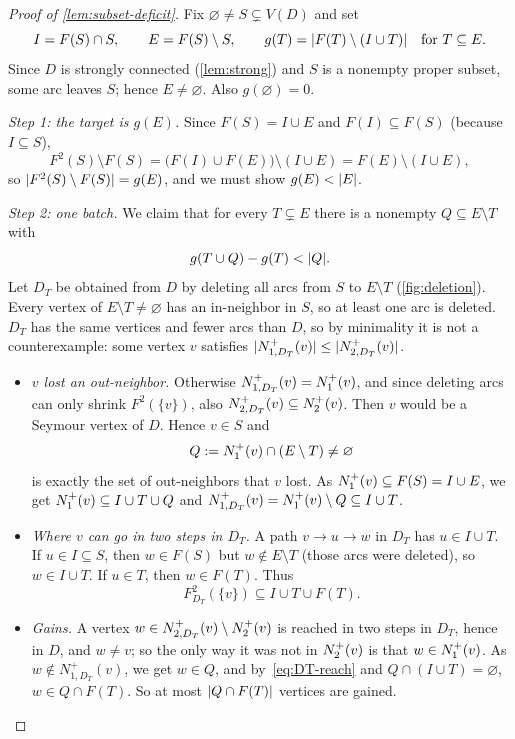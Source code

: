 \begin{proof}[Proof of \cref{lem:subset-deficit}]
Fix $\varnothing\ne S\subsetneq V(D)$ and set
\[
 I=F(S)\cap S,\qquad E=F(S)\setminus S,\qquad
 g(T)=\lvert F(T)\setminus(I\cup T)\rvert\quad\text{for }T\subseteq E.
\]
Since $D$ is strongly connected (\cref{lem:strong}) and $S$ is a nonempty
proper subset, some arc leaves $S$; hence $E\ne\varnothing$. Also
$g(\varnothing)=0$.

\emph{Step 1: the target is $g(E)$.} Since $F(S)=I\cup E$ and
$F(I)\subseteq F(S)$ (because $I\subseteq S$),
\[
 F^2(S)\setminus F(S)=\bigl(F(I)\cup F(E)\bigr)\setminus(I\cup E)
 =F(E)\setminus(I\cup E),
\]
so $\lvert F^2(S)\setminus F(S)\rvert=g(E)$, and we must show $g(E)<\lvert E\rvert$.

\emph{Step 2: one batch.} We claim that for every $T\subsetneq E$ there is a
nonempty $Q\subseteq E\setminus T$ with
\begin{equation}\label{eq:increment}
 g(T\cup Q)-g(T)<\lvert Q\rvert.
\end{equation}
Let $D_T$ be obtained from $D$ by deleting all arcs from $S$ to $E\setminus T$
(\cref{fig:deletion}). Every vertex of $E\setminus T\neq\varnothing$ has an
in-neighbor in $S$, so at least one arc is deleted. $D_T$ has the same
vertices and fewer arcs than $D$, so by minimality it is not a
counterexample: some vertex $v$ satisfies
$\lvert N^+_{1,D_T}(v)\rvert\le\lvert N^+_{2,D_T}(v)\rvert$.

\begin{itemize}[leftmargin=*]
\item \emph{$v$ lost an out-neighbor.} Otherwise $N^+_{1,D_T}(v)=N^+_1(v)$, and
since deleting arcs can only shrink $F^2(\{v\})$, also
$N^+_{2,D_T}(v)\subseteq N^+_2(v)$. Then $v$ would be a Seymour vertex of $D$.
Hence $v\in S$ and
\[
 Q:=N^+_1(v)\cap(E\setminus T)\ne\varnothing
\]
is exactly the set of out-neighbors that $v$ lost. As
$N^+_1(v)\subseteq F(S)=I\cup E$, we get $N^+_1(v)\subseteq I\cup T\cup Q$
and $N^+_{1,D_T}(v)=N^+_1(v)\setminus Q\subseteq I\cup T$.

\item \emph{Where $v$ can go in two steps in $D_T$.} A path $v\to u\to w$ in
$D_T$ has $u\in I\cup T$. If $u\in I\subseteq S$, then $w\in F(S)$ but $w\notin
E\setminus T$ (those arcs were deleted), so $w\in I\cup T$. If $u\in T$,
then $w\in F(T)$. Thus
\begin{equation}\label{eq:DT-reach}
 F^2_{D_T}(\{v\})\subseteq I\cup T\cup F(T).
\end{equation}

\item \emph{Gains.} A vertex $w\in N^+_{2,D_T}(v)\setminus N^+_2(v)$ is reached
in two steps in $D_T$, hence in $D$, and $w\ne v$; so the only way it was
not in $N^+_2(v)$ is that $w\in N^+_1(v)$. As $w\notin N^+_{1,D_T}(v)$, we get
$w\in Q$, and by~\eqref{eq:DT-reach} and $Q\cap(I\cup T)=\varnothing$,
$w\in Q\cap F(T)$. So at most $\lvert Q\cap F(T)\rvert$ vertices are gained.


\end{itemize}
\end{proof}
